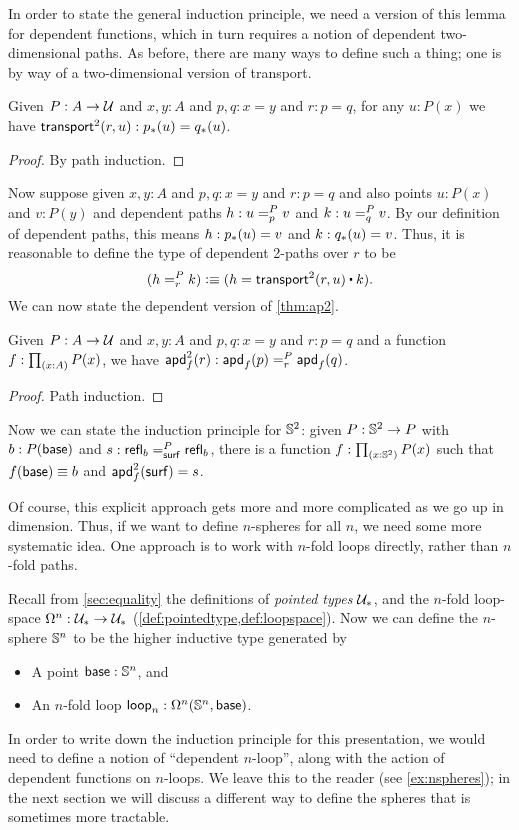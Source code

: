 In order to state the general induction principle, we need a version of this lemma for dependent functions, which in turn requires a notion of dependent two-dimensional paths.
As before, there are many ways to define such a thing; one is by way of a two-dimensional version of transport.

\begin{lem}\label{thm:transport2}
  Given $P:A\to\type$ and $x,y:A$ and $p,q:x=y$ and $r:p=q$, for any $u:P(x)$ we have $\transtwo r u : \trans p u = \trans q u$.
\end{lem}
\begin{proof}
  By path induction.
\end{proof}

Now suppose given $x,y:A$ and $p,q:x=y$ and $r:p=q$ and also points $u:P(x)$ and $v:P(y)$ and dependent paths $h:\dpath P p u v$ and $k:\dpath P q u v$.
By our definition of dependent paths, this means $h:\trans p u = v$ and $k:\trans q u = v$.
Thus, it is reasonable to define the type of dependent 2-paths over $r$ to be
\[ (\dpath P r h k )\defeq (h = \transtwo r u \ct k). \]
We can now state the dependent version of \autoref{thm:ap2}.

\begin{lem}\label{thm:apd2}
  Given $P:A\to\type$ and $x,y:A$ and $p,q:x=y$ and $r:p=q$ and a function $f:\prd{x:A} P(x)$, we have
  $\apdtwo f r : \dpath P r {\apd f p}{\apd f q}$.
\end{lem}
\begin{proof}
  Path induction.
\end{proof}

%
Now we can state the induction principle for $\Sn^2$: given $P:\Sn^2\to P$ with $b:P(\base)$ and $s:\dpath P \surf {\refl b}{\refl b}$, there is a function $f:\prd{x:\Sn^2} P(x)$ such that $f(\base)\jdeq b$ and $\apdtwo f \surf = s$.

%

Of course, this explicit approach gets more and more complicated as we go up in dimension.
Thus, if we want to define $n$-spheres for all $n$, we need some more systematic idea.
One approach is to work with $n$-fold loops directly, rather than $n$-fold paths.

%
Recall from \autoref{sec:equality} the definitions of \emph{pointed types} $\type_*$, and the $n$-fold loop-space $\Omega^n : \type_* \to \type_*$
(\cref{def:pointedtype,def:loopspace}).  Now we can define the
$n$-sphere $\Sn^n$ to be the higher inductive type generated by
%
\begin{itemize}
\item A point $\base:\Sn^n$, and
\item An $n$-fold loop $\lloop_n : \Omega^n(\Sn^n,\base)$.
\end{itemize}
In order to write down the induction principle for this presentation, we would need to define a notion of ``dependent $n$-loop'', along with the action of dependent functions on $n$-loops.
We leave this to the reader (see \autoref{ex:nspheres}); in the next section we will discuss a different way to define the spheres that is sometimes more tractable.


